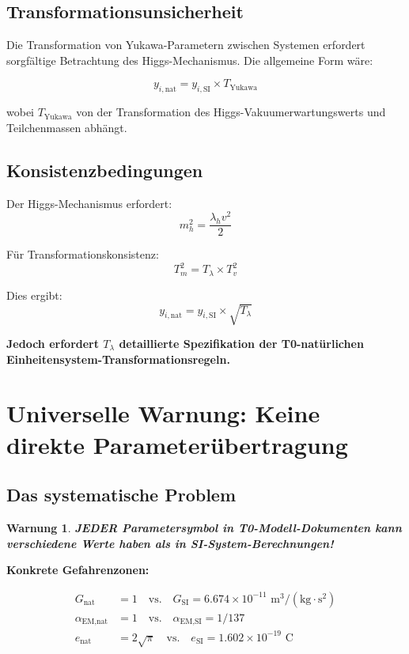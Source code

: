 \documentclass[12pt,a4paper]{article}
\newcommand{\lambdah}{\lambda_h}
\newcommand{\pichar}{\pi}
\newtheorem{warning}[theorem]{Warnung}
\begin{document}
	\subsection{Transformationsunsicherheit}
	\label{subsec:yukawa_transformation}
	
	Die Transformation von Yukawa-Parametern zwischen Systemen erfordert sorgfältige Betrachtung des Higgs-Mechanismus. Die allgemeine Form wäre:
	
	$$y_{i,\text{nat}} = y_{i,\text{SI}} \times T_{\text{Yukawa}}$$
	
	wobei $T_{\text{Yukawa}}$ von der Transformation des Higgs-Vakuumerwartungswerts und Teilchenmassen abhängt.
	
	\subsection{Konsistenzbedingungen}
	\label{subsec:yukawa_konsistenz}
	
	Der Higgs-Mechanismus erfordert:
	$$m_h^2 = \frac{\lambdah v^2}{2}$$
	
	Für Transformationskonsistenz:
	$$T_m^2 = T_\lambda \times T_v^2$$
	
	Dies ergibt:
	$$y_{i,\text{nat}} = y_{i,\text{SI}} \times \sqrt{T_\lambda}$$
	
	\textbf{Jedoch erfordert $T_\lambda$ detaillierte Spezifikation der T0-natürlichen Einheitensystem-Transformationsregeln.}
	
	\section{Universelle Warnung: Keine direkte Parameterübertragung}
	\label{sec:universelle_warnung}
	
	\subsection{Das systematische Problem}
	\label{subsec:systematisches_problem}
	
	\begin{warning}
		\textbf{JEDER Parametersymbol in T0-Modell-Dokumenten kann verschiedene Werte haben als in SI-System-Berechnungen!}
	\end{warning}
	
	\textbf{Konkrete Gefahrenzonen:}
	
	\begin{align}
		G_{\text{nat}} &= 1 \quad \text{vs.} \quad G_{\text{SI}} = 6.674 \times 10^{-11} \text{ m}^3/(\text{kg} \cdot \text{s}^2) \\
		\alpha_{\text{EM,nat}} &= 1 \quad \text{vs.} \quad \alpha_{\text{EM,SI}} = 1/137 \\
		e_{\text{nat}} &= 2\sqrt{\pichar} \quad \text{vs.} \quad e_{\text{SI}} = 1.602 \times 10^{-19} \text{ C}
	\end{align}
	
\end{document}
